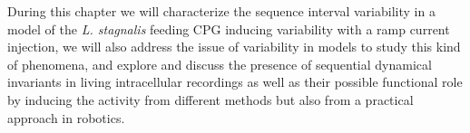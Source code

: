 During this chapter we will characterize the sequence interval variability in a model of the \textit{L. stagnalis} feeding CPG inducing variability with a ramp current injection, we will also address the issue of variability in models to study this kind of phenomena, and explore and discuss the presence of sequential dynamical invariants in living intracellular recordings as well as their possible functional role by inducing the activity from different methods but also from a practical approach in robotics. 


